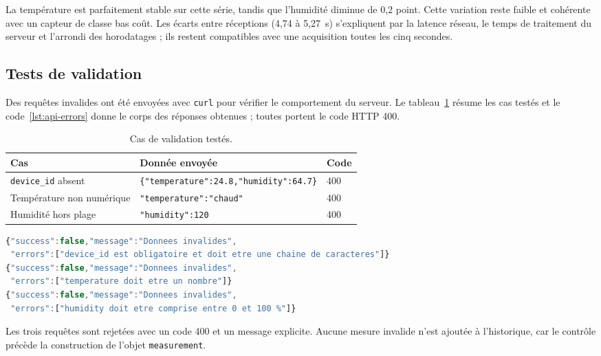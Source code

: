 \documentclass[11pt,a4paper]{article}
\begin{document}
La température est parfaitement stable sur cette série, tandis que l'humidité diminue de
0,2 point. Cette variation reste faible et cohérente avec un capteur de classe bas coût. Les
écarts entre réceptions (4,74 à 5,27~s) s'expliquent par la latence réseau, le temps de
traitement du serveur et l'arrondi des horodatages ; ils restent compatibles avec une
acquisition toutes les cinq secondes.

\subsection{Tests de validation}

Des requêtes invalides ont été envoyées avec \texttt{curl} pour vérifier le comportement du
serveur. Le tableau~\ref{tab:tests} résume les cas testés et le code~\ref{lst:api-errors}
donne le corps des réponses obtenues ; toutes portent le code HTTP 400.

\begin{table}[H]
\centering
\small
\begin{tabularx}{\textwidth}{@{}p{3.4cm} X p{1.7cm}@{}}
\toprule
Cas & Donnée envoyée & Code \\
\midrule
\texttt{device\_id} absent & \texttt{\{"temperature":24.8,"humidity":64.7\}} & 400 \\
Température non numérique & \texttt{"temperature":"chaud"} & 400 \\
Humidité hors plage & \texttt{"humidity":120} & 400 \\
\bottomrule
\end{tabularx}
\caption{Cas de validation testés.}
\label{tab:tests}
\end{table}

\begin{lstlisting}[language=JavaScript,caption={Corps des réponses HTTP 400 renvoyées par le serveur.},label={lst:api-errors},aboveskip=4pt,belowskip=4pt]
{"success":false,"message":"Donnees invalides",
 "errors":["device_id est obligatoire et doit etre une chaine de caracteres"]}
{"success":false,"message":"Donnees invalides",
 "errors":["temperature doit etre un nombre"]}
{"success":false,"message":"Donnees invalides",
 "errors":["humidity doit etre comprise entre 0 et 100 %"]}
\end{lstlisting}

\enlargethispage{3\baselineskip}
Les trois requêtes sont rejetées avec un code 400 et un message explicite. Aucune mesure
invalide n'est ajoutée à l'historique, car le contrôle précède la construction de l'objet
\texttt{measurement}.
\end{document}
